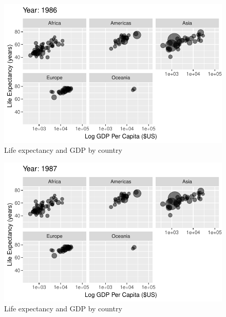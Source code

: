 \documentclass[
  letterpaper,
  DIV=11,
  numbers=noendperiod]{scrreport}
\theoremstyle{definition}
\theoremstyle{remark}
\begin{document}
\begin{figure}

{\centering \includegraphics{index_files/figure-pdf/fig-anim-lifegdp-63.pdf}

}

\caption{\label{fig-anim-lifegdp-63}Life expectancy and GDP by country}

\end{figure}

\begin{figure}

{\centering \includegraphics{index_files/figure-pdf/fig-anim-lifegdp-64.pdf}

}

\caption{\label{fig-anim-lifegdp-64}Life expectancy and GDP by country}

\end{figure}
\end{document}
